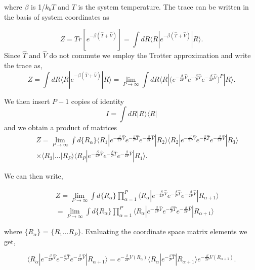 \documentclass[phd,tocprelim]{cornell}
\begin{document}
where $\beta$ is  1/$k_bT$ and $T$ is the system temperature. 
The trace can be written in the basis of system coordinates as 

\begin{equation}
Z= Tr[e^{-\beta (\hat{T} + \hat{V})}] = \int dR \langle R | e^{-\beta(\hat{T} + \hat{V})} | R \rangle.
\end{equation}
Since $\hat{T}$ and $\hat{V}$ do not commute we employ the Trotter approximation and write the trace as, 
\begin{equation}
Z = \int dR \langle R | e^{-\beta(\hat{T} + \hat{V})} | R \rangle = \lim_{P \to \infty} \int dR \langle R |  \big(e^{ -\frac{\beta}{2P}\hat{V}} e^{-\frac{\beta}{P}\hat{T}} e^{ -\frac{\beta}{2P}\hat{V}}\big)^P | R \rangle.
\end{equation}

We then insert $P-1$ copies of identity
\begin{equation}
I = \int dR |R \rangle \langle R|
\end{equation}
and we obtain a product of matrices 
\begin{eqnarray}
&&Z = \lim_{P \to \infty} \int d\{R_{\alpha}\} \langle R_1 | e^{ -\frac{\beta}{2P}\hat{V}} e^{-\frac{\beta}{P}\hat{T}} e^{-\frac{\beta}{2P}\hat{V}} |R_2 \rangle  
\langle R _2| e^{- \frac{\beta}{2P}\hat{V}} e^{-\frac{\beta}{P}\hat{T}} e^{ -\frac{\beta}{2P}\hat{V}}|R_3 \rangle
 \\ 
\nonumber
&& \times
\langle R _3 | \dots |R_P \rangle\langle R _P| e^{- \frac{\beta}{2P}\hat{V}} e^{-\frac{\beta}{P}\hat{T}} e^{- \frac{\beta}{2P}\hat{V}}|R_1 \rangle.
\nonumber
\end{eqnarray}
 
We can then write,

\begin{eqnarray}
&&Z =  \lim_{P \to \infty}\int d\{R_{\alpha}\} \prod_{\alpha=1}^{P} \langle R _{\alpha} | e^{- \frac{\beta}{2P}\hat{V}} e^{-\frac{\beta}{P}\hat{T}} e^{- \frac{\beta}{2P}\hat{V}} |R_{\alpha+1} \rangle 
 \\ 
\nonumber
&&=\lim_{P \to \infty}\int d\{R_{\alpha}\} \prod_{\alpha=1}^{P} \langle R _{\alpha} | e^{- \frac{\beta}{2P}\hat{V}} e^{-\frac{\beta}{P}\hat{T}} e^{ -\frac{\beta}{2P}\hat{V}} |R_{\alpha+1} \rangle 
\nonumber
\end{eqnarray}

where $\{R_{\alpha}\}$ = $\{R_1 \dots R_P\}$. Evaluating the coordinate space matrix elements we get, 

\begin{equation}
 \langle R _{\alpha} | e^{ -\frac{\beta}{2P}\hat{V}} e^{-\frac{\beta}{P}\hat{T}} e^{ -\frac{\beta}{2P}\hat{V}} |R_{\alpha+1} \rangle = e^{ -\frac{\beta}{2P}V(R_{\alpha})}\langle R _{\alpha} |  e^{-\frac{\beta}{P}\hat{T}}|R_{\alpha+1} \rangle  e^{- \frac{\beta}{2P}V(R_{\alpha+1})}. 
\end{equation}
\end{document}
